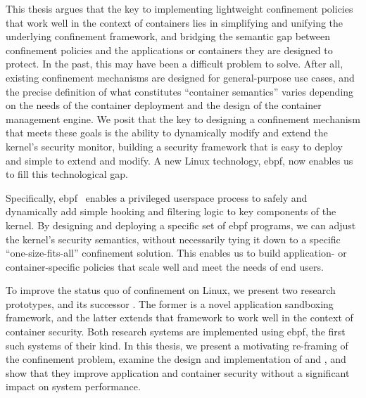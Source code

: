 This thesis argues that the key to implementing lightweight confinement policies that
work well in the context of containers lies in simplifying and unifying the underlying
confinement framework, and bridging the semantic gap between confinement policies and the
applications or containers they are designed to protect. In the past, this may have been
a difficult problem to solve. After all, existing confinement mechanisms are designed for
general-purpose use cases, and the precise definition of what constitutes
\enquote{container semantics} varies depending on the needs of the container deployment
and the design of the container management engine. We posit that the key to designing
a confinement mechanism that meets these goals is the ability to dynamically modify and
extend the kernel's security monitor, building a security framework that is easy to deploy
and simple to extend and modify. A new Linux technology, \gls{ebpf}, now enables us to
fill this technological gap.

Specifically, \gls{ebpf}~\cite{gregg2019_bpf, starovoitov2014_ebpf} enables a privileged
userspace process to safely and dynamically add simple hooking and filtering logic to key
components of the kernel. By designing and deploying a specific set of \gls{ebpf}
programs, we can adjust the kernel's security semantics, without necessarily tying it down
to a specific \enquote{one-size-fits-all} confinement solution. This enables us to build
application- or container-specific policies that scale well and meet the needs of
end users.

To improve the status quo of confinement on Linux, we present two research prototypes,
\bpfbox{} and its successor \bpfcontain{}. The former is a novel application sandboxing
framework, and the latter extends that framework to work well in the context of container
security. Both research systems are implemented using \gls{ebpf}, the first such systems
of their kind. In this thesis, we present a motivating re-framing of the confinement
problem, examine the design and implementation of \bpfbox{} and \bpfcontain{}, and show
that they improve application and container security without a significant impact on
system performance.


